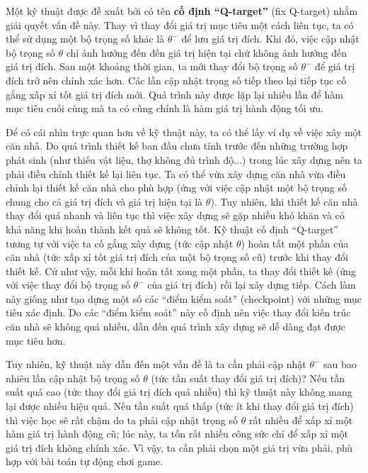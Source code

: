 	Một kỹ thuật được đề xuất bởi \cite{mnihdqn2015} có tên \textbf{cố định ``Q-target''} (fix Q-target) nhằm giải quyết vấn đề này.
	Thay vì thay đổi giá trị mục tiêu một cách liên tục, ta có thể sử dụng một bộ trọng số khác là $\theta^{-}$ để lưu giá trị đích.
	Khi đó, việc cập nhật bộ trọng số $\theta$ chỉ ảnh hưởng đến đến giá trị hiện tại chứ không ảnh hưởng đến giá trị đích.
	Sau một khoảng thời gian, ta mới thay đổi bộ trọng số $\theta^{-}$ để giá trị đích trở nên chính xác hơn.
	Các lần cập nhật trọng số tiếp theo lại tiếp tục cố gắng xấp xỉ tốt giá trị đích mới.
	Quá trình này được lặp lại nhiều lần để hàm mục tiêu cuối cùng mà ta có cũng chính là hàm giá trị hành động tối ưu.
	
	Để có cái nhìn trực quan hơn về kỹ thuật này, ta có thể lấy ví dụ về việc xây một căn nhà.
	Do quá trình thiết kế ban đầu chưa tính trước đến những trường hợp phát sinh (như thiếu vật liệu, thợ không đủ trình độ...) trong lúc xây dựng nên ta phải điều chỉnh thiết kế lại liên tục.
	Ta có thể vừa xây dựng căn nhà vừa điều chỉnh lại thiết kế căn nhà cho phù hợp (ứng với việc cập nhật một bộ trọng số chung cho cả giá trị đích và giá trị hiện tại là $\theta$).
	Tuy nhiên, khi thiết kế căn nhà thay đổi quá nhanh và liên tục thì việc xây dựng sẽ gặp nhiều khó khăn và có khả năng khi hoàn thành kết quả sẽ không tốt.
	Kỹ thuật cố định ``Q-target'' tương tự với việc ta cố gắng xây dựng (tức cập nhật $\theta$) hoàn tất một phần của căn nhà (tức xấp xỉ tốt giá trị đích của một bộ trọng số cũ) trước khi thay đổi thiết kế.
	Cứ như vậy, mỗi khi hoàn tất xong một phần, ta thay đổi thiết kế (ứng với việc thay đổi bộ trọng số $\theta^{-}$ của giá trị đích) rồi lại xây dựng tiếp.
	Cách làm này giống như tạo dựng một số các ``điểm kiểm soát'' (checkpoint) với những mục tiêu xác định.
	Do các ``điểm kiểm soát'' này cố định nên việc thay đổi kiến trúc căn nhà sẽ không quá nhiều, dẫn đến quá trình xây dựng sẽ dễ dàng đạt được mục tiêu hơn.
	
	Tuy nhiên, kỹ thuật này dẫn đến một vấn đề là ta cần phải cập nhật $\theta^{-}$ sau bao nhiêu lần cập nhật bộ trọng số $\theta$ (tức tần suất thay đổi giá trị đích)?
	Nếu tần suất quá cao (tức thay đổi giá trị đích quá nhiều) thì kỹ thuật này không mang lại được nhiều hiệu quả.
	Nếu tần suất quá thấp (tức ít khi thay đổi giá trị đích) thì việc học sẽ rất chậm do ta phải cập nhật trọng số $\theta$ rất nhiều để xấp xỉ một hàm giá trị hành động cũ; lúc này, ta tốn rất nhiều công sức chỉ để xấp xỉ một giá trị đích không chính xác.
	Vì vậy, ta cần phải chọn một giá trị vừa phải, phù hợp với bài toán tự động chơi game.

